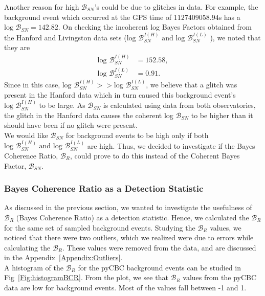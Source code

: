 \documentclass{article}
\begin{document}
  Another reason for high $\mathcal{B}_{SN}$'s could be due to glitches in data. For example, the background event which occurred at the GPS time of $1127409058.94$s has a $\text{log }\mathcal{B}_{SN} = 142.82$. On checking the incoherent log Bayes Factors obtained from the Hanford and Livingston data sets ($	\text{log }\mathcal{B}_{SN}^{I(H)}\text{ and } 	\text{log }\mathcal{B}_{SN}^{I(L)}$ ), we noted that they are 
 \begin{align*}
 	\text{log }\mathcal{B}_{SN}^{I(H)}&=152.58, \\
 	\text{log }\mathcal{B}_{SN}^{I(L)} &=0.91.
 	\end{align*}
 Since  in this case, $\text{log }\mathcal{B}_{SN}^{I(H)} > > \text{log }\mathcal{B}_{SN}^{I(L)}$, we believe that a glitch was present in the Hanford data which in turn caused this background event's $\text{log }\mathcal{B}_{SN}^{I(H)}$ to be large. As $\mathcal{B}_{SN}$ is calculated using data from both observatories, the glitch in the Hanford data causes the coherent log $\mathcal{B}_{SN}$ to be higher than it should have been if no glitch were present.\\
 
 
 
 
  We would like $\mathcal{B}_{SN}$ for background events to be high only if both $\text{log }\mathcal{B}_{SN}^{I(H)}\text{ and } 	\text{log }\mathcal{B}_{SN}^{I(L)}$ are high. Thus, we decided to investigate if the  Bayes Coherence Ratio, $\mathcal{B}_{R}$, could prove to do this instead of the Coherent Bayes Factor, $\mathcal{B}_{SN}$.
  
  
 
 \subsubsection{Bayes Coherence Ratio as a Detection Statistic}
 
 
 As discussed in the previous section, we wanted to investigate the usefulness of $\mathcal{B}_{R}$ (Bayes Coherence Ratio) as a detection statistic. Hence, we calculated the $\mathcal{B}_{R}$ for the same set of sampled background events. Studying the $\mathcal{B}_{R}$ values, we noticed that there were two outliers, which we realized were due to errors while calculating the $\mathcal{B}_{R}$. These values were removed from the data, and are discussed in the Appendix~\ref{Appendix:Outliers}.\\
  
  A histogram of the $\mathcal{B}_{R}$ for the pyCBC background events can be studied in Fig~\ref{Fig:histogramBCR}. From the plot, we see that $\mathcal{B}_{R}$ values from the pyCBC data are low for background events. Most of the values fall between -1 and 1. 
     
\end{document}
